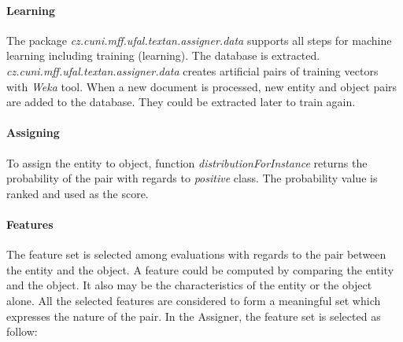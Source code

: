 \paragraph{Learning}
The package \emph{cz.\-cuni.\-mff.\-ufal.\-textan.\-assigner.\-data} supports all steps for
machine learning including training (learning). The database is extracted. 
\emph{cz.\-cuni.\-mff.\-ufal.\-textan.\-assigner.\-data} creates artificial pairs of
training vectors with \textit{Weka} tool. When a new document is processed,
new entity and object pairs are added to the database. They could be extracted
later to train again.

\paragraph{Assigning}
To assign the entity to object, function \emph{distributionForInstance} returns
the probability of the pair with regards to \emph{positive} class. The
probability value is ranked and used as the score.

\paragraph{Features}

The feature set is selected among evaluations with regards to the pair between
the entity and the object. A feature could be computed by comparing the entity 
and the object. It also may be the characteristics of the entity or the object 
alone. All the selected features are considered to form a meaningful set which
expresses the nature of the pair. In the Assigner, the feature set is selected 
as follow:

